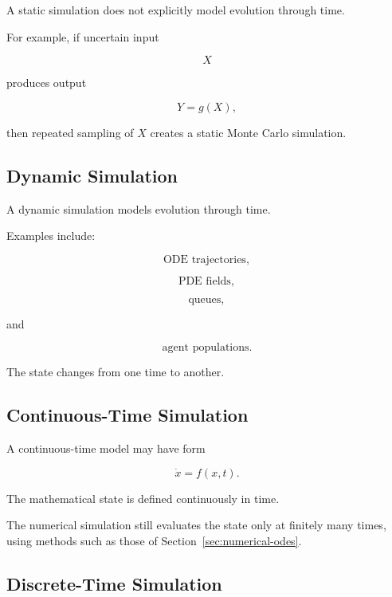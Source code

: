 A static simulation does not explicitly model evolution through time.

For example, if uncertain input

\[
X
\]

produces output

\[
Y=g(X),
\]

then repeated sampling of \(X\) creates a static Monte Carlo simulation.

\subsection{Dynamic Simulation}
\label{subsec:dynamic-simulation}

A dynamic simulation models evolution through time.

Examples include:

\[
\boxed{
\text{ODE trajectories},
}
\]

\[
\boxed{
\text{PDE fields},
}
\]

\[
\boxed{
\text{queues},
}
\]

and

\[
\boxed{
\text{agent populations}.
}
\]

The state changes from one time to another.

\subsection{Continuous-Time Simulation}
\label{subsec:continuous-time-simulation}

A continuous-time model may have form

\[
\boxed{
\dot{x}
=
f(x,t).
}
\]

The mathematical state is defined continuously in time.

The numerical simulation still evaluates the state only at finitely many
times, using methods such as those of
Section~\ref{sec:numerical-odes}.

\subsection{Discrete-Time Simulation}
\label{subsec:discrete-time-simulation}

